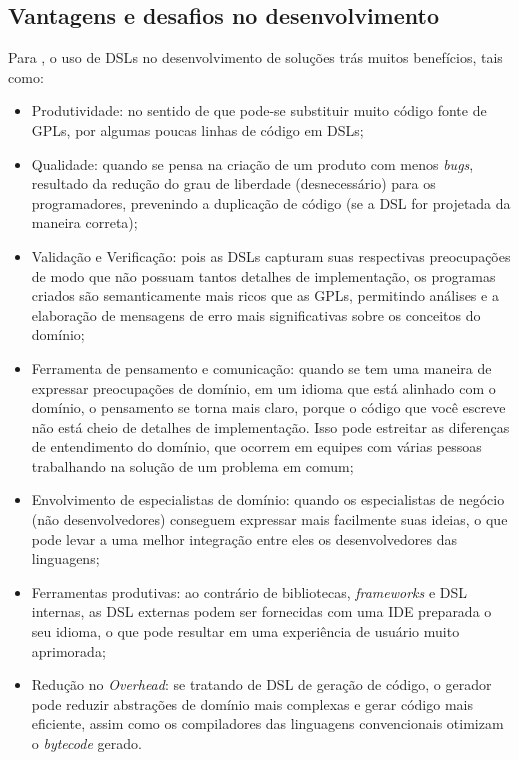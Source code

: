 \subsection{Vantagens e desafios no desenvolvimento}
\label{beneficiosdsl}

Para , o uso de \gls{DSL}s no desenvolvimento de soluções trás muitos benefícios, tais como:

\begin{itemize}
    \item Produtividade: no sentido de que pode-se substituir muito código fonte de \gls{GPL}s, por algumas poucas linhas de código em \gls{DSL}s;
    
    \item Qualidade: quando se pensa na criação de um produto com menos \textit{bugs}, resultado da redução do grau de liberdade (desnecessário) para os programadores, prevenindo a duplicação de código (se a \gls{DSL} for projetada da maneira correta);
    
    \item Validação e Verificação: pois as \gls{DSL}s capturam suas respectivas preocupações de modo que não possuam tantos detalhes de implementação, os programas criados são semanticamente mais ricos que as \gls{GPL}s, permitindo análises e a elaboração de mensagens de erro mais significativas sobre os conceitos do domínio;
    
    \item Ferramenta de pensamento e comunicação: quando se tem uma maneira de expressar preocupações de domínio, em um idioma que está alinhado com o domínio, o pensamento se torna mais claro, porque o código que você escreve não está cheio de detalhes de implementação. Isso pode estreitar as diferenças de entendimento do domínio, que ocorrem em equipes com várias pessoas trabalhando na solução de um problema em comum;
    
    \item Envolvimento de especialistas de domínio: quando os especialistas de negócio (não desenvolvedores) conseguem expressar mais facilmente suas ideias, o que pode levar a uma melhor integração entre eles os desenvolvedores das linguagens;
    
    \item Ferramentas produtivas: ao contrário de bibliotecas, \textit{frameworks} e \gls{DSL} internas, as \gls{DSL} externas podem ser fornecidas com uma \gls{IDE} preparada o seu idioma, o que pode resultar em uma experiência de usuário muito aprimorada;

    \item Redução no \textit{Overhead}: se tratando de \gls{DSL} de geração de código, o gerador pode reduzir abstrações de domínio mais complexas e gerar código mais eficiente, assim como os compiladores das linguagens convencionais otimizam o \textit{bytecode} gerado.
\end{itemize}

